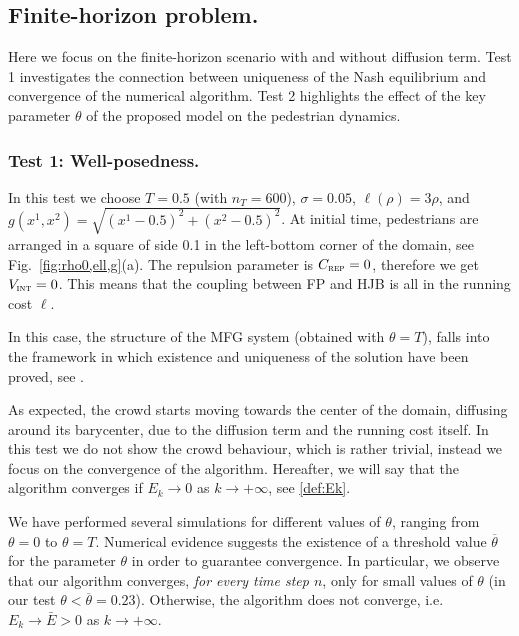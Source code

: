 \documentclass{cmslatex}
\newcommand{\Vi}{V_\textsc{int}}
\begin{document}
\subsection{Finite-horizon problem.}
Here we focus on the finite-horizon scenario with and without diffusion term. 
Test 1 investigates the connection between uniqueness of the Nash equilibrium and convergence of the numerical algorithm. 
Test 2 highlights the effect of the key parameter $\theta$ of the proposed model on the pedestrian dynamics.
%
%
\subsubsection{Test 1: Well-posedness.}
In this test we choose $T=0.5$ (with $n_T=600$), $\sigma=0.05$, $\ell(\rho)=3 \rho$, and $g(x^1,x^2)=\sqrt{(x^1-0.5)^2+(x^2-0.5)^2}$. 
At initial time, pedestrians are arranged in a square of side 0.1 in the left-bottom corner of the domain, see Fig.\ \ref{fig:rho0,ell,g}(a).
The repulsion parameter is $C_\textsc{rep}=0$, therefore we get $\Vi=0$. This means that the coupling between FP and HJB is all in the running cost $\ell$.

In this case, the structure of the MFG system (obtained with $\theta=T$), falls into the framework in which existence and uniqueness of the solution have been proved, see \cite{lasry2007}.

As expected, the crowd starts moving towards the center of the domain, diffusing around its barycenter, due to the diffusion term and the running cost itself.
In this test we do not show the crowd behaviour, which is rather trivial, instead we focus on the convergence of the algorithm. 
Hereafter, we will say that the algorithm converges if  $E_k\to 0$ as $k\to +\infty$, see \eqref{def:Ek}.

We have performed several simulations for different values of $\theta$, ranging from $\theta=0$ to $\theta=T$. 
Numerical evidence suggests the existence of a threshold value $\overline{\theta}$ for the parameter $\theta$ in order to guarantee convergence. 
In particular, we observe that our algorithm converges, \emph{for every time step $n$}, only for small values of $\theta$ (in our test $ \theta <\overline{\theta}= 0.23$). %
Otherwise, the algorithm does not converge, i.e.\ $E_k\to \bar E>0$ as $k\to +\infty$.
\end{document}
